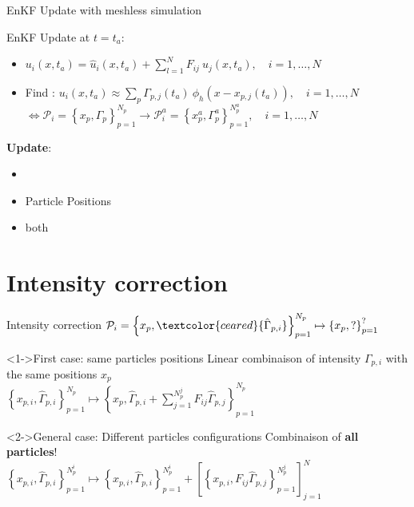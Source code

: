 \documentclass[aspectratio=169]{beamer} %
\begin{document}
\begin{frame}{EnKF Update with meshless simulation}
    \begin{block}{EnKF Update at $t=t_a$:}
        \begin{itemize}
            \item $u_i(x, t_a) = \hat u_i(x, t_a) + \sum_{l=1}^{N} F_{ij}~\hat u_j(x, t_a), \quad i = 1, \dots, N$
            \item Find : $u_i(x, t_a) \approx \sum_p \Gamma_{p, j}(t_a)~\phi_h (x - x_{p, j}(t_a)), \quad i = 1, \dots, N$\\
                  $\Leftrightarrow \mathcal P_i = \left\{x_p, \Gamma_p\right\}_{p=1}^{N_p} \rightarrow \mathcal P_i^a = \left\{x_p^a, \Gamma^a_p\right\}_{p=1}^{N^a_p}, \quad i = 1, \dots, N$
        \end{itemize}
    \end{block}
    \vfill

    \textbf{Update}:
    \begin{itemize}
        \item<1->   
        \item<1-> Particle Positions
        \item<1-> both
    \end{itemize}
\end{frame}

\section{Intensity correction}

\begin{frame}{Intensity correction}
    $\mathcal{P}_i = \left\{x_p, \textcolor{ceared}{\hat \Gamma_{p, i}}\right\}_{p=1}^{N_p} \mapsto \left\{x_p, ? \right\}_{p=1}^{?}$

    \begin{block}<1->{First case: same particles positions}
        Linear combinaison of intensity $\Gamma_{p,i}$ with the same positions $x_p$\\
        $\left\{x_{p,i}, \hat \Gamma_{p,i}\right\}_{p=1}^{N_p} \mapsto \left\{x_p, \hat \Gamma_{p, i} + \sum_{j=1}^{N_p^j} F_{ij} \hat \Gamma_{p,j} \right\}_{p=1}^{N_p}$
    \end{block}
    \begin{block}<2->{General case: Different particles configurations}
        Combinaison of \textbf{all particles}! \\
        $ \left\{x_{p,i}, \hat \Gamma_{p,i}\right\}_{p=1}^{N^i_p} \mapsto \left\{x_{p,i}, \hat \Gamma_{p,i} \right\}_{p=1}^{N_p^i} + \left[\left\{x_{p,i}, F_{ij} \hat \Gamma_{p,j}\right\}_{p=1}^{N_p^j}\right]_{j=1}^N$ \\
    \end{block}
\end{frame}
\end{document}
